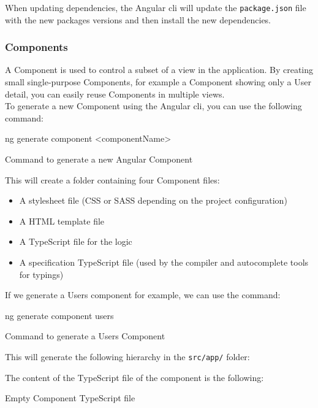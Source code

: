 \documentclass[twoside, openright,11pt,a4paper]{book}
\newenvironment{code}{\captionsetup{type=listing}}{}
\begin{document}
When updating dependencies, the Angular \gls{cli} will update the \verb+package.json+ file with the new packages versions and then install the new dependencies.

\subsubsection{Components}
A Component\cite{angular:doc:components} is used to control a subset of a view in the application. By creating small single-purpose Components, for example a Component showing only a User detail, you can easily reuse Components in multiple views. \\

To generate a new Component using the Angular \gls{cli}, you can use the following command:
\begin{code}
	\begin{shell}
ng generate component <componentName>
	\end{shell}
	\caption{Command to generate a new Angular Component}
\end{code}

This will create a folder containing four Component files:
\begin{itemize}
	\item A stylesheet file (CSS or SASS depending on the project configuration)
	\item A HTML template file
	\item A TypeScript file for the logic
	\item A specification TypeScript file (used by the compiler and autocomplete tools for typings)
\end{itemize}

If we generate a Users component for example, we can use the command:
\begin{code}
	\begin{shell}
ng generate component users
	\end{shell}
	\caption{Command to generate a Users Component}
\end{code}
This will generate the following hierarchy in the \verb+src/app/+ folder:

The content of the TypeScript file of the component is the following:
\begin{code}
	\caption{Empty Component TypeScript file}
	\label{component_code}
\end{code}
\end{document}
